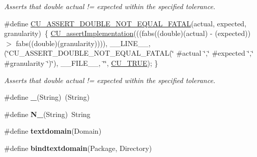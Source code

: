 \begin{DoxyCompactItemize}
\begin{DoxyCompactList}\small\item\em Asserts that double actual != expected within the specified tolerance. \end{DoxyCompactList}\item 
\#define \hyperlink{group__Framework_ga934dd0005a515631aeae60535488d3b5}{C\-U\-\_\-\-A\-S\-S\-E\-R\-T\-\_\-\-D\-O\-U\-B\-L\-E\-\_\-\-N\-O\-T\-\_\-\-E\-Q\-U\-A\-L\-\_\-\-F\-A\-T\-A\-L}(actual, expected, granularity)~\{ \hyperlink{group__Framework_ga31a858e8b496b2af992b63902064c5fa}{C\-U\-\_\-assert\-Implementation}(((fabs((double)(actual) -\/ (expected)) $>$ fabs((double)(granularity)))), \-\_\-\-\_\-\-L\-I\-N\-E\-\_\-\-\_\-, (\char`\"{}C\-U\-\_\-\-A\-S\-S\-E\-R\-T\-\_\-\-D\-O\-U\-B\-L\-E\-\_\-\-N\-O\-T\-\_\-\-E\-Q\-U\-A\-L\-\_\-\-F\-A\-T\-A\-L(\char`\"{} \#actual \char`\"{},\char`\"{}  \#expected \char`\"{},\char`\"{} \#granularity \char`\"{})\char`\"{}), \-\_\-\-\_\-\-F\-I\-L\-E\-\_\-\-\_\-, \char`\"{}\char`\"{}, \hyperlink{group__Framework_ga99641394bc766ca9c4a295e942fed1ef}{C\-U\-\_\-\-T\-R\-U\-E}); \}
\begin{DoxyCompactList}\small\item\em Asserts that double actual != expected within the specified tolerance. \end{DoxyCompactList}\item 
\hypertarget{group__Framework_ga32a3cf3d9dd914f5aeeca5423c157934}{\#define {\bfseries \-\_\-}(String)~(String)}\label{group__Framework_ga32a3cf3d9dd914f5aeeca5423c157934}

\item 
\hypertarget{group__Framework_ga75278405e7f034d2b1af80bfd94675fe}{\#define {\bfseries N\-\_\-}(String)~String}\label{group__Framework_ga75278405e7f034d2b1af80bfd94675fe}

\item 
\hypertarget{group__Framework_ga3adff4c69f0a5613a459ff23d749166c}{\#define {\bfseries textdomain}(Domain)}\label{group__Framework_ga3adff4c69f0a5613a459ff23d749166c}

\item 
\hypertarget{group__Framework_ga19d270d34b833dec51cd00fd788010da}{\#define {\bfseries bindtextdomain}(Package, Directory)}\label{group__Framework_ga19d270d34b833dec51cd00fd788010da}


\end{DoxyCompactItemize}
